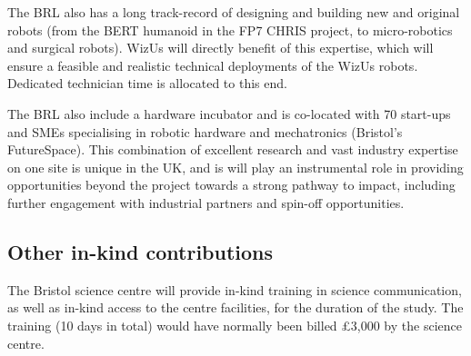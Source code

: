 The BRL also has a long track-record of designing and building new and original
robots (from the BERT humanoid in the FP7 CHRIS project, to micro-robotics and
surgical robots). WizUs will directly benefit of this expertise, which will
ensure a feasible and realistic technical deployments of the WizUs robots.
Dedicated technician time is allocated to this end.

The BRL also include a hardware incubator and is co-located with 70 start-ups
and SMEs specialising in robotic hardware and mechatronics (Bristol’s
FutureSpace). This combination of excellent research and vast industry expertise
on one site is unique in the UK, and is will play an instrumental role in
providing opportunities beyond the project towards a strong pathway to impact,
including further engagement with industrial partners and spin-off
opportunities.

\subsection{Other in-kind contributions}

The Bristol science centre will provide in-kind training in science
communication, as well as in-kind access to the centre facilities, for the
duration of the study. The training (10 days in total) would have normally
been billed £3,000 by the science centre.


